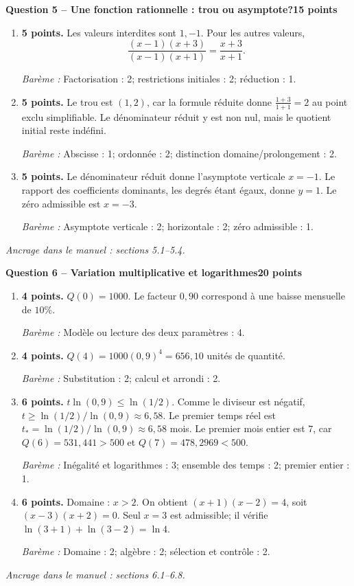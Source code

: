 \documentclass[11pt,a4paper]{article}
\begin{document}
\newpage
{\large\bfseries Question 5 -- Une fonction rationnelle : trou ou asymptote?}\hfill\textbf{15 points}\par
\begin{enumerate}
\item \textbf{5 points.} Les valeurs interdites sont \(1,-1\). Pour les autres valeurs, \[\frac{(x-1)(x+3)}{(x-1)(x+1)}=\frac{x+3}{x+1}.\]
\par{\small\textit{Barème : }Factorisation : 2; restrictions initiales : 2; réduction : 1.}
\item \textbf{5 points.} Le trou est \((1,2)\), car la formule réduite donne \(\frac{1+3}{1+1}=2\) au point exclu simplifiable. Le dénominateur réduit y est non nul, mais le quotient initial reste indéfini.
\par{\small\textit{Barème : }Abscisse : 1; ordonnée : 2; distinction domaine/prolongement : 2.}
\item \textbf{5 points.} Le dénominateur réduit donne l’asymptote verticale \(x=-1\). Le rapport des coefficients dominants, les degrés étant égaux, donne \(y=1\). Le zéro admissible est \(x=-3\).
\par{\small\textit{Barème : }Asymptote verticale : 2; horizontale : 2; zéro admissible : 1.}
\end{enumerate}
\vfill {\small\textit{Ancrage dans le manuel : sections 5.1--5.4.}}

\newpage
{\large\bfseries Question 6 -- Variation multiplicative et logarithmes}\hfill\textbf{20 points}\par
\begin{enumerate}
\item \textbf{4 points.} \(Q(0)=1000\). Le facteur \(0{,}90\) correspond à une baisse mensuelle de \(10\%\).
\par{\small\textit{Barème : }Modèle ou lecture des deux paramètres : 4.}
\item \textbf{4 points.} \(Q(4)=1000(0{,}9)^4=656{,}10\) unités de quantité.
\par{\small\textit{Barème : }Substitution : 2; calcul et arrondi : 2.}
\item \textbf{6 points.} \(t\ln(0{,}9)\le\ln(1/2)\). Comme le diviseur est négatif, \(t\ge\ln(1/2)/\ln(0{,}9)\approx6{,}58\). Le premier temps réel est \(t_*=\ln(1/2)/\ln(0{,}9)\approx6{,}58\) mois. Le premier mois entier est \(7\), car \(Q(6)=531{,}441>500\) et \(Q(7)=478{,}2969<500\).
\par{\small\textit{Barème : }Inégalité et logarithmes : 3; ensemble des temps : 2; premier entier : 1.}
\item \textbf{6 points.} Domaine : \(x>2\). On obtient \((x+1)(x-2)=4\), soit \((x-3)(x+2)=0\). Seul \(x=3\) est admissible; il vérifie \(\ln(3+1)+\ln(3-2)=\ln4\).
\par{\small\textit{Barème : }Domaine : 2; algèbre : 2; sélection et contrôle : 2.}
\end{enumerate}
\vfill {\small\textit{Ancrage dans le manuel : sections 6.1--6.8.}}
\end{document}
